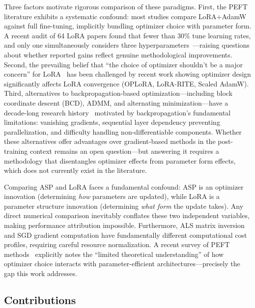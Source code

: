 \documentclass[11pt]{article}
\begin{document}
Three factors motivate rigorous comparison of these paradigms. First, the PEFT literature exhibits a systematic confound: most studies compare LoRA+AdamW against full fine-tuning, implicitly bundling optimizer choice with parameter form. A recent audit of 64 LoRA papers found that fewer than 30\% tune learning rates, and only one simultaneously considers three hyperparameters~\cite{lee2026learning}---raising questions about whether reported gains reflect genuine methodological improvements. Second, the prevailing belief that ``the choice of optimizer shouldn't be a major concern'' for LoRA~\cite{raschka2023practical} has been challenged by recent work showing optimizer design significantly affects LoRA convergence (OPLoRA, LoRA-RITE, Scaled AdamW). Third, alternatives to backpropagation-based optimization---including block coordinate descent (BCD), ADMM, and alternating minimization---have a decade-long research history~\cite{zeng2019global,wang2018accelerated,choromanska2019beyond,taylor2016training} motivated by backpropagation's fundamental limitations: vanishing gradients, sequential layer dependency preventing parallelization, and difficulty handling non-differentiable components. Whether these alternatives offer advantages over gradient-based methods in the post-training context remains an open question---but answering it requires a methodology that disentangles optimizer effects from parameter form effects, which does not currently exist in the literature.

Comparing ASP and LoRA faces a fundamental confound: ASP is an optimizer innovation (determining \textit{how} parameters are updated), while LoRA is a parameter structure innovation (determining \textit{what form} the update takes). Any direct numerical comparison inevitably conflates these two independent variables, making performance attribution impossible. Furthermore, ALS matrix inversion and SGD gradient computation have fundamentally different computational cost profiles, requiring careful resource normalization. A recent survey of PEFT methods~\cite{lialin2023scaling} explicitly notes the ``limited theoretical understanding'' of how optimizer choice interacts with parameter-efficient architectures---precisely the gap this work addresses.

\subsection{Contributions}
\end{document}
